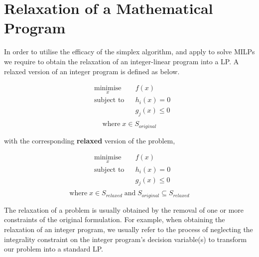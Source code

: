         
\section{Relaxation of a Mathematical Program}
\label{section: Appednix Relaxation}
In order to utilise the efficacy of the simplex algorithm, and apply to solve MILPs we require to obtain the relaxation of an integer-linear program into a LP. A relaxed version of an integer program is defined as below.

\begin{equation}
\begin{aligned}
& \underset{x}{\text{minimise}}
& & f(x) \\
& \text{subject to}
& & h_i(x) = 0 \\
& & & g_j(x) \leq 0 \\
\end{aligned}
\end{equation}
\[\text{where} \; x \in S_{original}\]

\noindent
with the corresponding \textbf{relaxed} version of the problem,\par

\begin{equation}
\begin{aligned}
& \underset{x}{\text{minimise}}
& & f(x) \\
& \text{subject to}
& & h_i(x) = 0 \\
& & & g_j(x) \leq 0 \\
\end{aligned}
\end{equation}
\[\text{where} \; x \in S_{relaxed} \; \text{and} \; S_{original} \subseteq S_{relaxed}\]

\vspace{\baselineskip}
\noindent
The relaxation of a problem is usually obtained by the removal of one or more constraints of the original formulation. For example, when obtaining the relaxation of an integer program, we usually refer to the process of neglecting the integrality constraint on the integer program's decision variable(s) to transform our problem into a standard LP.




